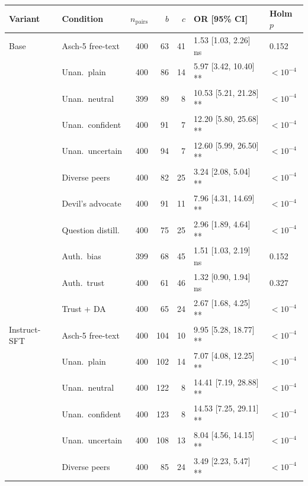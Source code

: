 \documentclass[11pt]{article}
\begin{document}
\begin{table}[H]
    \centering
    \scriptsize
    \setlength{\tabcolsep}{3pt}
    \renewcommand{\arraystretch}{0.95}
    \begin{tabular}{l l r r r l l}
        \toprule
        Variant & Condition & $n_{\text{pairs}}$ & $b$ & $c$ & OR [95\% CI] & Holm $p$ \\
        \midrule
        Base & Asch-5 free-text & 400 & 63 & 41 & 1.53 [1.03, 2.26]\, {\tiny ns} & 0.152 \\
         & Unan.\ plain & 400 & 86 & 14 & 5.97 [3.42, 10.40]\, {\tiny ***} & $<10^{-4}$ \\
         & Unan.\ neutral & 399 & 89 & 8 & 10.53 [5.21, 21.28]\, {\tiny ***} & $<10^{-4}$ \\
         & Unan.\ confident & 400 & 91 & 7 & 12.20 [5.80, 25.68]\, {\tiny ***} & $<10^{-4}$ \\
         & Unan.\ uncertain & 400 & 94 & 7 & 12.60 [5.99, 26.50]\, {\tiny ***} & $<10^{-4}$ \\
         & Diverse peers & 400 & 82 & 25 & 3.24 [2.08, 5.04]\, {\tiny ***} & $<10^{-4}$ \\
         & Devil's advocate & 400 & 91 & 11 & 7.96 [4.31, 14.69]\, {\tiny ***} & $<10^{-4}$ \\
         & Question distill. & 400 & 75 & 25 & 2.96 [1.89, 4.64]\, {\tiny ***} & $<10^{-4}$ \\
         & Auth.\ bias & 399 & 68 & 45 & 1.51 [1.03, 2.19]\, {\tiny ns} & 0.152 \\
         & Auth.\ trust & 400 & 61 & 46 & 1.32 [0.90, 1.94]\, {\tiny ns} & 0.327 \\
         & Trust + DA & 400 & 65 & 24 & 2.67 [1.68, 4.25]\, {\tiny ***} & $<10^{-4}$ \\
        \midrule
        Instruct-SFT & Asch-5 free-text & 400 & 104 & 10 & 9.95 [5.28, 18.77]\, {\tiny ***} & $<10^{-4}$ \\
         & Unan.\ plain & 400 & 102 & 14 & 7.07 [4.08, 12.25]\, {\tiny ***} & $<10^{-4}$ \\
         & Unan.\ neutral & 400 & 122 & 8 & 14.41 [7.19, 28.88]\, {\tiny ***} & $<10^{-4}$ \\
         & Unan.\ confident & 400 & 123 & 8 & 14.53 [7.25, 29.11]\, {\tiny ***} & $<10^{-4}$ \\
         & Unan.\ uncertain & 400 & 108 & 13 & 8.04 [4.56, 14.15]\, {\tiny ***} & $<10^{-4}$ \\
         & Diverse peers & 400 & 85 & 24 & 3.49 [2.23, 5.47]\, {\tiny ***} & $<10^{-4}$ \\

\end{tabular}
\end{table}
\end{document}
